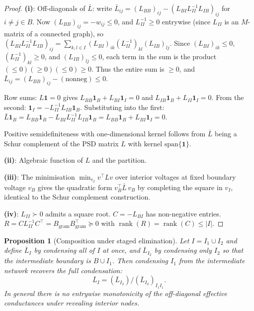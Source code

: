 \documentclass[11pt,a4paper]{article}
\numberwithin{equation}{section}
\DeclareMathOperator{\rank}{rank}
\theoremstyle{thmcompact}
\newtheorem{proposition}[theorem]{Proposition}
\theoremstyle{remark}
\begin{document}
\begin{proof}
\textbf{(i)}: Off-diagonals of $\bar{L}$: write $\bar{L}_{ij} = (L_{BB})_{ij} - (L_{BI}L_{II}^{-1}L_{IB})_{ij}$ for $i \neq j \in B$. Now $(L_{BB})_{ij} = -w_{ij} \leq 0$, and $L_{II}^{-1} \geq 0$ entrywise (since $L_{II}$ is an $M$-matrix of a connected graph), so $(L_{BI}L_{II}^{-1}L_{IB})_{ij} = \sum_{k,l \in I}(L_{BI})_{ik}(L_{II}^{-1})_{kl}(L_{IB})_{lj}$. Since $(L_{BI})_{ik} \leq 0$, $(L_{II}^{-1})_{kl} \geq 0$, and $(L_{IB})_{lj} \leq 0$, each term in the sum is the product $(\leq 0)(\geq 0)(\leq 0) \geq 0$. Thus the entire sum is $\geq 0$, and $\bar{L}_{ij} = (L_{BB})_{ij} - (\text{nonneg}) \leq 0$.

Row sums: $L\mathbf{1} = 0$ gives $L_{BB}\mathbf{1}_B + L_{BI}\mathbf{1}_I = 0$ and $L_{IB}\mathbf{1}_B + L_{II}\mathbf{1}_I = 0$. From the second: $\mathbf{1}_I = -L_{II}^{-1}L_{IB}\mathbf{1}_B$. Substituting into the first: $\bar{L}\mathbf{1}_B = L_{BB}\mathbf{1}_B - L_{BI}L_{II}^{-1}L_{IB}\mathbf{1}_B = L_{BB}\mathbf{1}_B + L_{BI}\mathbf{1}_I = 0$.

Positive semidefiniteness with one-dimensional kernel follows from $\bar{L}$ being a Schur complement of the PSD matrix $L$ with kernel $\mathrm{span}\{\mathbf{1}\}$.

\textbf{(ii)}: Algebraic function of $L$ and the partition.

\textbf{(iii)}: The minimisation $\min_{v_I} v^\top L v$ over interior voltages at fixed boundary voltage $v_B$ gives the quadratic form $v_B^\top \bar{L}\, v_B$ by completing the square in $v_I$, identical to the Schur complement construction.

\textbf{(iv)}: $L_{II} \succ 0$ admits a square root. $C = -L_{BI}$ has non-negative entries. $R = C L_{II}^{-1} C^\top = B_{\mathrm{gram}}B_{\mathrm{gram}}^\top \succeq 0$ with $\rank(R) = \rank(C) \leq |I|$.
\end{proof}

\begin{proposition}[Composition under staged elimination]\label{prop:bridge-F-refine}
Let $I = I_1 \cup I_2$ and define $\bar{L}_I$ by condensing all of $I$ at once, and $\bar{L}_{I_2}$ by condensing only $I_2$ so that the intermediate boundary is $B \cup I_1$. Then condensing $I_1$ from the intermediate network recovers the full condensation:
\begin{equation}\label{eq:F-compose}
\bar{L}_I = (\bar{L}_{I_2})/(\bar{L}_{I_2})_{I_1 I_1}.
\end{equation}
In general there is no entrywise monotonicity of the off-diagonal effective conductances under revealing interior nodes.
\end{proposition}
\end{document}
